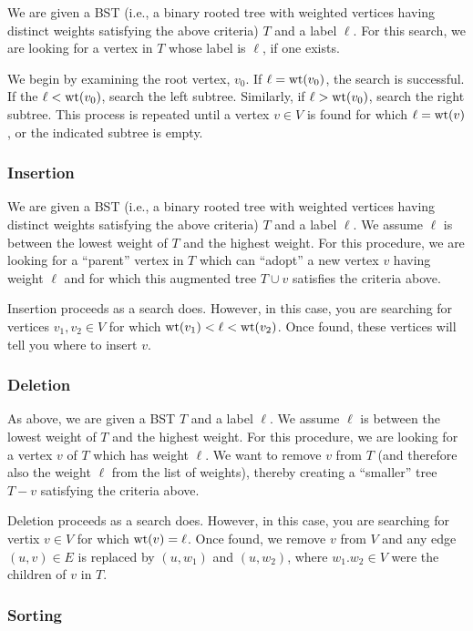 We are given a BST (i.e., a binary rooted tree with weighted vertices
having distinct weights satisfying the above criteria) $T$ and a
label $\ell$. For this search, we are looking for a vertex in $T$
whose label is $\ell$, if one exists.

We begin by examining the root vertex, $v_0$. If $\ell={\rm wt}(v_0)$,
the search is successful. If the $\ell<{\rm wt}(v_0)$,
search the left subtree. Similarly, if $\ell>{\rm wt}(v_0)$,
search the right subtree. This process is repeated until a vertex
$v\in V$ is found for which $\ell={\rm wt}(v)$,
or the indicated subtree is empty.


\subsubsection{Insertion}

We are given a BST (i.e., a binary rooted tree with weighted vertices
having distinct weights satisfying the above criteria) $T$ and a
label $\ell$. We assume $\ell$ is between the
lowest weight of $T$ and the highest weight.
For this procedure, we are looking for a ``parent''
vertex in $T$ which can ``adopt'' a new vertex $v$ having weight $\ell$
and for which this augmented tree $T\cup v$ satisfies
the criteria above.

Insertion proceeds as a search does. However, in this case, you are
searching for vertices $v_1,v_2\in V$ for which
${\rm wt}(v_1)<\ell < {\rm wt}(v_2)$. Once found, these
vertices will tell you where to insert $v$.

\subsubsection{Deletion}

As above, we are given a BST $T$ and a
label $\ell$. We assume $\ell$ is between the
lowest weight of $T$ and the highest weight.
For this procedure, we are looking for a vertex $v$ of
$T$ which has weight $\ell$. We want to remove $v$ from
$T$ (and therefore also the weight $\ell$ from the list of weights),
thereby creating a ``smaller'' tree $T- v$ satisfying
the criteria above.

Deletion proceeds as a search does. However, in this case, you are
searching for vertix $v\in V$ for which
${\rm wt}(v)=\ell$. Once found, we remove $v$ from $V$
and any edge $(u,v)\in E$ is replaced by $(u,w_1)$
and $(u,w_2)$, where $w_1.w_2\in V$ were the children of $v$
in $T$.

\subsubsection{Sorting}

